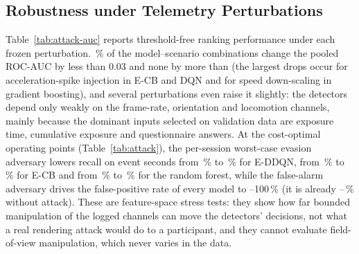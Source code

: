 \subsection{Robustness under Telemetry Perturbations}
\label{sec:attack}
Table~\ref{tab:attack-auc} reports threshold-free ranking performance under each frozen perturbation. \AttAucFracSmall\,\% of the model--scenario combinations change the pooled ROC-AUC by less than 0.03 and none by more than \AttAucMaxAbsChange{} (the largest drops occur for acceleration-spike injection in E-CB and DQN and for speed down-scaling in gradient boosting), and several perturbations even raise it slightly: the detectors depend only weakly on the frame-rate, orientation and locomotion channels, mainly because the dominant inputs selected on validation data are exposure time, cumulative exposure and questionnaire answers. At the cost-optimal operating points (Table~\ref{tab:attack}), the per-session worst-case evasion adversary lowers recall on event seconds from \EDDQNAttCleanRecall\,\% to \EDDQNAttWorstRecall\,\% for E-DDQN, from \ECBAttCleanRecall\,\% to \ECBAttWorstRecall\,\% for E-CB and from \RFAttCleanRecall\,\% to \RFAttWorstRecall\,\% for the random forest, while the false-alarm adversary drives the false-positive rate of every model to \EDDQNAttWorstFPR--100\,\% (it is already \RFAttCleanFPR--\CSMLPAttCleanFPR\,\% without attack). These are feature-space stress tests: they show how far bounded manipulation of the logged channels can move the detectors' decisions, not what a real rendering attack would do to a participant, and they cannot evaluate field-of-view manipulation, which never varies in the data.

\begin{table}[t]
\centering
\caption{Threshold-free robustness: pooled outer-test ROC-AUC of the seed-ensemble score on clean telemetry and under whole-session perturbations (the last column gives the most negative and most positive change over all 17 whole-session variants).}
\label{tab:attack-auc}
\resizebox{\textwidth}{!}{}
\end{table}

\begin{table}[t]
\centering
\caption{Recall/false-positive rate (\%) on perturbed seconds at the D1 operating point, and per-session adaptive worst cases (evasion: minimum recall; false-alarm induction: maximum FPR) over all whole-session candidates.}
\label{tab:attack}
\resizebox{\textwidth}{!}{}
\end{table}

